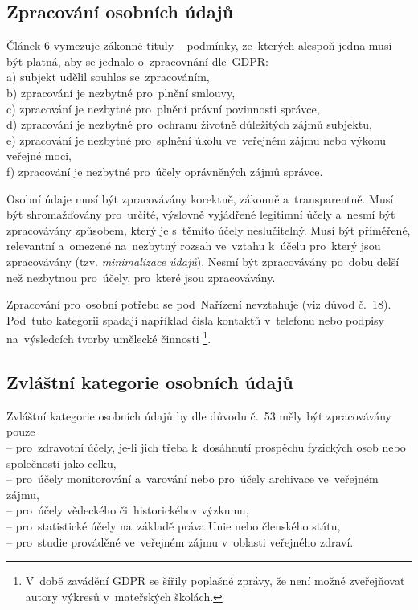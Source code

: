\subsection{Zpracování osobních údajů}

Článek 6 vymezuje zákonné tituly -- podmínky, ze~kterých alespoň jedna musí být platná, aby se jednalo o~zpracovnání dle~GDPR:
%
\\a) subjekt udělil souhlas se~zpracováním,
\\b) zpracování je nezbytné pro~plnění smlouvy,
\\c) zpracování je nezbytné pro~plnění právní povinnosti správce,
\\d) zpracování je nezbytné pro~ochranu životně důležitých zájmů subjektu,
\\e) zpracování je nezbytné pro~splnění úkolu ve~veřejném zájmu nebo výkonu veřejné moci,
\\f) zpracování je nezbytné pro~účely oprávněných zájmů správce.

Osobní údaje musí být zpracovávány korektně, zákonně a~transparentně.
Musí být shromažďovány pro~určité, výslovně vyjádřené legitimní účely a~nesmí být zpracovávány způsobem, který je s~těmito účely neslučitelný.
Musí být přiměřené, relevantní a~omezené na~nezbytný rozsah ve~vztahu k~účelu pro~který jsou zpracovávány (tzv. \emph{minimalizace údajů}).
Nesmí být zpracovávány po~dobu delší než nezbytnou pro~účely, pro~které jsou zpracovávány.

Zpracování pro~osobní potřebu se pod~Nařízení nevztahuje (viz důvod č.~18).
Pod~tuto kategorii spadají například čísla kontaktů v~telefonu nebo podpisy na~výsledcích tvorby umělecké činnosti%
\footnote{V~době zavádění GDPR se šířily poplašné zprávy, že není možné zveřejňovat autory výkresů v~mateřských školách.}.

\subsection{Zvláštní kategorie osobních údajů}

Zvláštní kategorie osobních údajů by dle důvodu č.~53 měly být zpracovávány pouze
\\-- pro~zdravotní účely, je-li jich třeba k~dosáhnutí prospěchu fyzických osob nebo společnosti jako celku,
\\-- pro~účely monitorování a~varování nebo pro~účely archivace ve~veřejném zájmu,
\\-- pro~účely vědeckého či~historickéhov výzkumu,
\\-- pro~statistické účely na~základě práva Unie nebo členského státu,
\\-- pro~studie prováděné ve~veřejném zájmu v~oblasti veřejného zdraví.

